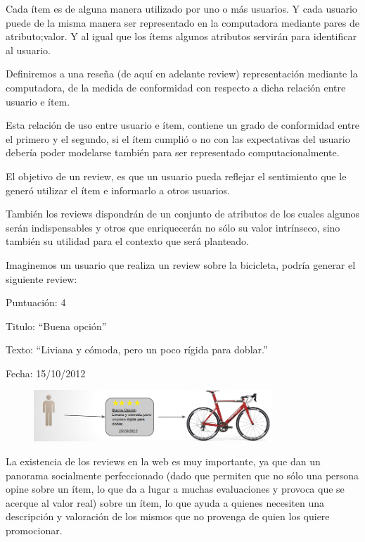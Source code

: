 Cada ítem es de alguna manera utilizado por uno o más usuarios. Y cada usuario puede de la misma manera ser representado en la computadora mediante pares de atributo;valor. Y al igual que los ítems algunos atributos servirán para identificar al usuario. 

Definiremos a una reseña (de aquí en adelante review) representación mediante la computadora, de la medida de conformidad con respecto a dicha relación entre usuario e ítem. 

Esta relación de uso entre usuario e ítem, contiene un grado de conformidad entre el primero y el segundo, si el ítem cumplió o no con las expectativas del usuario debería poder modelarse también para ser representado computacionalmente.

El objetivo de un review, es que un usuario pueda reflejar el sentimiento que le generó utilizar el ítem e informarlo a otros usuarios. 

También los reviews dispondrán de un conjunto de atributos de los cuales algunos serán indispensables y otros que enriquecerán no sólo su valor intrínseco, sino también su utilidad para el contexto que será planteado.

Imaginemos un usuario que realiza un review sobre la bicicleta, podría generar el siguiente review:

Puntuación: 4 

Titulo: ``Buena opción''

Texto: ``Liviana y cómoda, pero un poco rígida para doblar.''

Fecha: 15/10/2012

\begin{figure}
    \centering
    \includegraphics[width=0.8\textwidth,natwidth=610,natheight=642]{biciReview.png}
\end{figure}

La existencia de los reviews en la web es muy importante, ya que dan un panorama socialmente perfeccionado (dado que permiten que no sólo una persona
opine sobre un ítem, lo que da a lugar a muchas evaluaciones y provoca que se acerque al valor real) sobre un ítem, lo que ayuda a 
quienes necesiten una descripción y valoración de los mismos que no provenga de quien los quiere promocionar.

